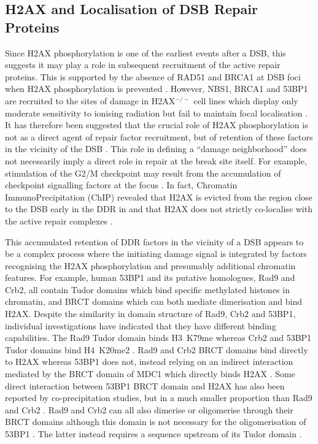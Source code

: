 \subsection{\textgamma H2AX and Localisation of DSB Repair Proteins}
Since H2AX phosphorylation is one of the earliest events after a DSB,
this suggests it may play a role in subsequent recruitment of the
active repair proteins. This is supported by the absence of RAD51 and
BRCA1 at DSB foci when \textgamma H2AX phosphorylation is prevented
\citep{TTP+00}. However, NBS1, BRCA1 and 53BP1 are recruited to the
sites of damage in H2AX$^{-/-}$ cell lines which display only moderate
sensitivity to ionising radiation but fail to maintain focal
localisation \citep{ACOF+03}.
It has therefore been suggested that the crucial role of H2AX
phosphorylation is not as a direct agent of repair factor recruitment,
but of retention of these factors in the vicinity of the DSB
\citep{ACOF+03}.
This role in defining a ``damage neighborhood'' does not necessarily
imply a direct role in repair at the break site itself. For example,
stimulation of the G2/M checkpoint may result from the accumulation of
checkpoint signalling factors at the focus \citep{OFHC+02}. In fact,
Chromatin ImmunoPrecipitation (ChIP) revealed that \textgamma H2AX is
evicted from the region close to the DSB early in the DDR in
 and that \textgamma H2AX does not strictly
co-localise with the active repair complexes \citep{RSAA+04}.

This accumulated retention of DDR factors in the vicinity of a DSB
appears to be a complex process where the initiating damage signal is
integrated by factors recognising the H2AX phosphorylation and
presumably additional chromatin features. For example, human 53BP1 and
its putative homologues,  Rad9 and
 Crb2, all contain Tudor domains which bind specific
methylated histones in chromatin, and BRCT domains which can both
mediate dimerisation and bind \textgamma H2AX\@. Despite the
similarity in domain structure of Rad9, Crb2 and 53BP1, individual
investigations have indicated that they have different binding
capabilities. The Rad9 Tudor domain binds H3~K79me
\citep{GCJ+07,HZDJ+04} whereas Crb2 and 53BP1 Tudor domains bind
H4~K20me2 \citep{SPM+04,BLW+06}.  Rad9 and Crb2 BRCT domains bind
directly to \textgamma H2AX \citep{HMH+07,KDR+08} whereas 53BP1 does
not, instead relying on an indirect interaction mediated by the BRCT
domain of MDC1 which directly binds \textgamma H2AX
\citep{MSL+05,MSJAC+05}. Some direct interaction between 53BP1 BRCT
domain and \textgamma H2AX has also been reported by co-precipitation
studies, but in a much smaller proportion than Rad9 and Crb2
\citep{KDR+08}. Rad9 and Crb2 can all also dimerise or oligomerise
through their BRCT domains \citep{SL99,DMR04} although this domain is
not necessary for the oligomerisation of 53BP1 \citep{AWX+05}. The
latter instead requires a sequence upstream of its Tudor domain
\citep{WKM+06}.

